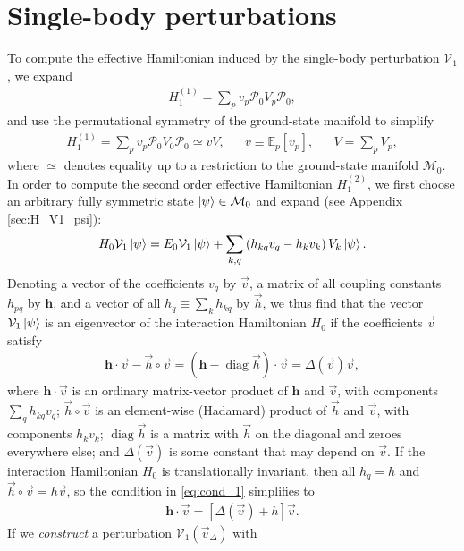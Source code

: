 \documentclass[nofootinbib,notitlepage,11pt]{revtex4-2}
\newcommand{\p}[1]{\left(#1\right)} %
\renewcommand{\sp}[1]{\left[#1\right]} %
\renewcommand{\c}{\cdot} %
\renewcommand{\oc}{\circ} %
\newcommand{\m}{\bm} %
\renewcommand{\v}{\vec} %
\newcommand{\1}{\mathds{1}}
\newcommand{\M}{\mathcal{M}}
\renewcommand{\P}{\mathcal{P}}
\newcommand{\V}{\mathcal{V}}
\newcommand{\EE}{\mathbb{E}}
\DeclareMathOperator{\diag}{diag}
\begin{document}
\section{Single-body perturbations}

To compute the effective Hamiltonian induced by the single-body
perturbation $\V_1$, we expand
\begin{align}
  H_1^{(1)} = \sum_p v_p \P_0 V_p \P_0,
\end{align}
and use the permutational symmetry of the ground-state manifold to
simplify
\begin{align}
  H_1^{(1)} =  \sum_p v_p \P_0 V_0 \P_0 \simeq v V,
  &&
  v \equiv \EE_p\sp{v_p},
  &&
  V = \sum_p V_p,
  \label{eq:H_1_1}
\end{align}
where $\simeq$ denotes equality up to a restriction to the
ground-state manifold $\M_0$.  In order to compute the second order
effective Hamiltonian $H_1^{(2)}$, we first choose an arbitrary fully
symmetric state $\ket\psi\in\M_0$ and expand (see Appendix
\ref{sec:H_V1_psi}):
\begin{align}
  H_0 \V_1 \ket\psi
  = E_0 \V_1 \ket\psi
  + \sum_{k,q} \p{h_{kq} v_q - h_k v_k} V_k \ket\psi.
  \label{eq:H_V1_psi}
\end{align}
Denoting a vector of the coefficients $v_q$ by $\v v$, a matrix of all
coupling constants $h_{pq}$ by $\m h$, and a vector of all
$h_q\equiv\sum_k h_{kq}$ by $\v h$, we thus find that the vector
$\V_1\ket\psi$ is an eigenvector of the interaction Hamiltonian $H_0$
if the coefficients $\v v$ satisfy
\begin{align}
  \m h \c \v v - \v h\oc\v v
  = \p{\m h-\diag\v h}\c\v v
  = \Delta\p{\v v} \v v,
  \label{eq:cond_1}
\end{align}
where $\m h\c\v v$ is an ordinary matrix-vector product of $\m h$ and
$\v v$, with components $\sum_q h_{kq} v_q$; $\v h\oc\v v$ is an
element-wise (Hadamard) product of $\v h$ and $\v v$, with components
$h_k v_k$; $\diag\v h$ is a matrix with $\v h$ on the diagonal and
zeroes everywhere else; and $\Delta\p{\v v}$ is some constant that may
depend on $\v v$.  If the interaction Hamiltonian $H_0$ is
translationally invariant, then all $h_q=h$ and $\v h\oc\v v=h\v v$,
so the condition in \eqref{eq:cond_1} simplifies to
\begin{align}
  \m h \c\v v = \sp{\Delta\p{\v v}+h} \v v.
\end{align}
If we {\it construct} a perturbation $\V_1\p{\v v_\Delta}$ with
\end{document}
